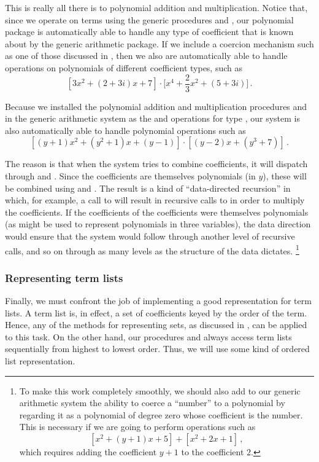 This is really all there is to polynomial addition and multiplication.
Notice that, since we operate on terms using the generic procedures  and , our polynomial package is automatically able to handle any type of coefficient that is known about by the generic arithmetic package.
If we include a coercion mechanism such as one of those discussed in , then we also are automatically able to handle operations on polynomials of different coefficient types, such as
\[
	[3 x^2 + (2 + 3i) x + 7]
	⋅ \biggl[ x^4 + \frac{2}{3} x^2 + (5 + 3i) \biggr] \,.
\]

Because we installed the polynomial addition and multiplication procedures  and  in the generic arithmetic system as the  and  operations for type , our system is also automatically able to handle polynomial operations such as
\[
	[ (y + 1) x^2 + (y^2 + 1) x + (y - 1) ] ⋅ [ (y - 2) x + (y^3 + 7) ] \,.
\]

The reason is that when the system tries to combine coefficients, it will dispatch through  and .
Since the coefficients are themselves polynomials (in \( y \)), these will be combined using  and .
The result is a kind of “data-directed recursion” in which, for example, a call to  will result in recursive calls to  in order to multiply the coefficients.
If the coefficients of the coefficients were themselves polynomials (as might be used to represent polynomials in three variables), the data direction would ensure that the system would follow through another level of recursive calls, and so on through as many levels as the structure of the data dictates.%
\footnote{
	To make this work completely smoothly, we should also add to our generic arithmetic system the ability to coerce a “number” to a polynomial by regarding it as a polynomial of degree zero whose coefficient is the number.
	This is necessary if we are going to perform operations such as
	\[
		[x^2 + (y + 1) x + 5] + [x^2 + 2 x + 1] \,,
	\]
	which requires adding the coefficient \( y + 1 \) to the coefficient \( 2 \).
}



\subsubsection*{Representing term lists}

Finally, we must confront the job of implementing a good representation for term lists.
A term list is, in effect, a set of coefficients keyed by the order of the term.
Hence, any of the methods for representing sets, as discussed in , can be applied to this task.
On the other hand, our procedures  and  always access term lists sequentially from highest to lowest order.
Thus, we will use some kind of ordered list representation.

